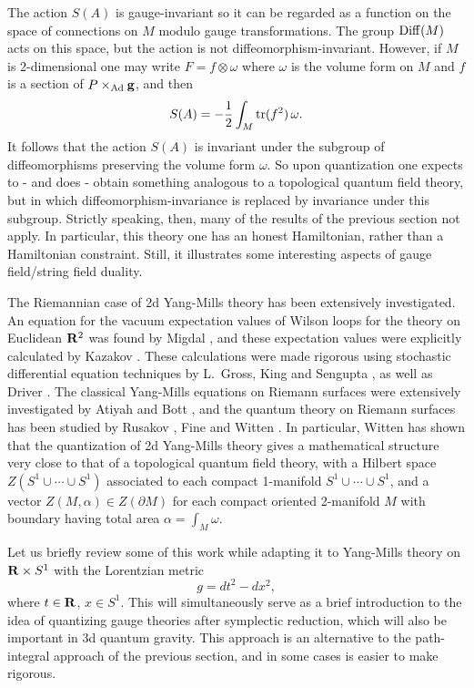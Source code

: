 \documentclass[12pt]{article}
\newcommand{\om}{\omega}
\newcommand{\tensor}{\otimes}
\newcommand{\g}{{\bf  g}}	%
\newcommand{\R}{{\bf R}}
\newcommand{\hf}{{1\over 2}}
\newcommand{\Ad}{{\rm Ad}}
\newcommand{\tr}{{\rm tr}}
\newcommand{\Diff}{{\rm Diff}}
\begin{document}
The action $S(A)$ is gauge-invariant so it can be regarded as a function on
the space of connections on $M$ modulo gauge transformations.  The group
$\Diff(M)$ acts on this space, but the action is not
diffeomorphism-invariant.  However, if $M$ is 2-dimensional one may write
$F = f \tensor \om$ where $\om$ is the volume form on $M$ and $f$ is a
section of $P \times_{\Ad} \g$, and then
\[          S(A) = -\hf \int_M \tr(f^2) \,\om.  \]
It follows that the action $S(A)$ is invariant under the subgroup of
diffeomorphisms preserving the volume form $\om$.  So upon quantization one
expects to - and does - obtain something analogous to a topological quantum
field theory, but in which diffeomorphism-invariance is replaced by
invariance under this subgroup. Strictly speaking, then, many of the
results of the previous section  not apply.  In particular, this theory one
has an honest Hamiltonian, rather than a Hamiltonian constraint.  Still, it
illustrates some interesting aspects of gauge field/string field duality.

The Riemannian case of 2d Yang-Mills theory has been extensively
investigated.    An equation for the vacuum expectation values of Wilson
loops for the theory on Euclidean $\R^2$  was found by Migdal
\cite{Migdal}, and these expectation values were explicitly calculated by
Kazakov \cite{Kazakov}.  These calculations were made rigorous using
stochastic differential equation techniques by L.\ Gross, King and Sengupta
\cite{GKS}, as well as Driver \cite{Driver}.  The classical Yang-Mills
equations on Riemann surfaces were extensively investigated by Atiyah and Bott
\cite{AB}, and the quantum theory on Riemann surfaces has been studied by
Rusakov \cite{Rusakov}, Fine \cite{Fine} and Witten \cite{Witten}.    In
particular, Witten has shown that the quantization of 2d Yang-Mills theory
gives a mathematical structure very close to that of a topological quantum
field theory, with a Hilbert space $Z(S^1 \cup \cdots \cup S^1)$ associated
to each compact 1-manifold $S^1 \cup \cdots \cup S^1$, and a vector
$Z(M,\alpha) \in Z(\partial M)$ for each compact oriented 2-manifold $M$
with boundary having total area $\alpha = \int_M \om$.

Let us briefly review some of this work while adapting it to Yang-Mills theory
on $\R \times S^1$ with the Lorentzian metric
\[                 g = dt^2 - dx^2,  \]
where $t \in \R$, $x \in S^1$.  This will simultaneously serve as a brief
introduction to the idea of quantizing gauge theories after symplectic
reduction, which will also be important in 3d quantum gravity.  This
approach is an alternative to the path-integral approach of the previous
section, and in some cases is easier to make rigorous.
\end{document}
